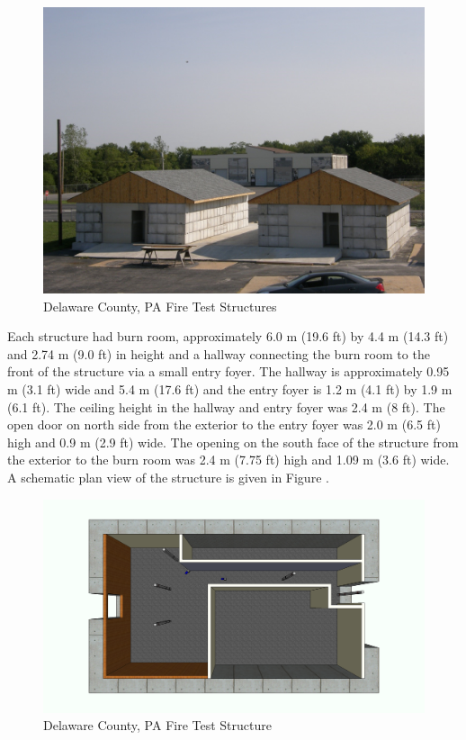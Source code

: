 \documentclass[12pt,oneside]{book}
\begin{document}
\begin{figure}[!ht]
	\includegraphics[width=6in]{../Figures/Pictures/DelCo_Structures}
	\caption{Delaware County, PA Fire Test Structures}
	\label{fig:Delaware_County,_PA_Fire_Test_Structures}
\end{figure}

Each structure had burn room, approximately 6.0 m (19.6 ft) by 4.4 m (14.3 ft) and 2.74 m (9.0 ft) in height and a hallway connecting the burn room to the front of the structure via a small entry foyer.  The hallway is approximately 0.95 m (3.1 ft) wide and 5.4 m (17.6 ft) and the entry foyer is 1.2 m (4.1 ft) by 1.9 m (6.1 ft).  The ceiling height in the hallway and entry foyer was 2.4 m (8 ft).  The open door on north side from the exterior to the entry foyer was 2.0 m (6.5 ft) high and 0.9 m (2.9 ft) wide.  The opening on the south face of the structure from the exterior to the burn room was 2.4 m (7.75 ft) high and 1.09 m (3.6 ft) wide.   A schematic plan view of the structure is given in Figure     .    

\begin{figure}[!ht]
	\includegraphics[width=6in]{../Figures/Pictures/DelCoSingleStory}
	\caption{Delaware County, PA Fire Test Structure}
	\label{fig:DelCoSingleStory}
\end{figure}
\end{document}

